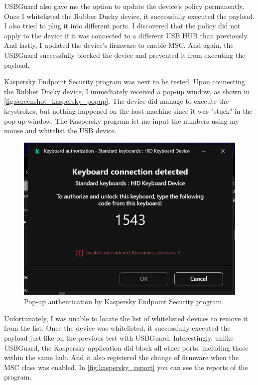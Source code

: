 USBGuard also gave me the option to update the device's policy permanently. Once I whitelisted the Rubber Ducky device, it successfully executed the payload. I also tried to plug it into different ports. I discovered that the policy did not apply to the device if it was connected to a different USB HUB than previously. And lastly, I updated the device's firmware to enable MSC. And again, the USBGuard successfully blocked the device and prevented it from executing the payload.

Kaspersky Endpoint Security program was next to be tested. Upon connecting the Rubber Ducky device, I immediately received a pop-up window, as shown in \autoref{fig:screenshot_kaspersky_popup}. The device did manage to execute the keystrokes, but nothing happened on the host machine since it was "stuck" in the pop-up window. The Kaspersky program let me input the numbers using my mouse and whitelist the USB device.
\begin{figure}[ht]
    \centering
    \includegraphics[width=\linewidth]{./obrazky-figures/kaspersky_keyboard_test.png}
    \caption{Pop-up authentication by Kaspersky Endpoint Security program.}
    \label{fig:screenshot_kaspersky_popup}
\end{figure}
Unfortunately, I was unable to locate the list of whitelisted devices to remove it from the list. Once the device was whitelisted, it successfully executed the payload just like on the previous test with USBGuard. Interestingly, unlike USBGuard, the Kaspersky application did block all other ports, including those within the same hub. And it also registered the change of firmware when the MSC class was enabled. In \autoref{fig:kaspersky_report} you can see the reports of the program.
